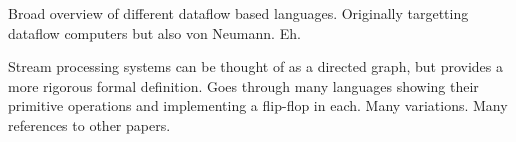 
Broad overview of different dataflow based languages.
Originally targetting dataflow computers but also von Neumann. Eh.


Stream processing systems can be thought of as a directed graph,
but provides a more rigorous formal definition.
Goes through many languages showing their primitive operations and
implementing a flip-flop in each. 
Many variations. Many references to other papers.
